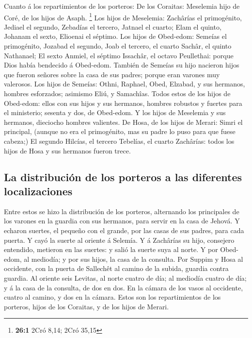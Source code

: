  Cuanto á los repartimientos de los porteros: De los
Coraitas: Meselemia hijo de Coré, de los hijos de Asaph. \footnote{\textbf{26:1}
  2Cró 8,14; 2Cró 35,15}  Los hijos de Meselemia:
Zachârías el primogénito, Jediael el segundo, Zebadías el tercero,
Jatnael el cuarto;  Elam el quinto, Johanam el sexto,
Elioenai el séptimo.  Los hijos de Obed-edom: Semeías el
primogénito, Jozabad el segundo, Joab el tercero, el cuarto Sachâr, el
quinto Nathanael;  El sexto Anmiel, el séptimo Issachâr,
el octavo Peullethai: porque Dios había bendecido á Obed-edom.
 También de Semeías su hijo nacieron hijos que fueron
señores sobre la casa de sus padres; porque eran varones muy valerosos.
 Los hijos de Semeías: Othni, Raphael, Obed, Elzabad, y
sus hermanos, hombres esforzados; asimismo Eliú, y Samachîas.
 Todos estos de los hijos de Obed-edom: ellos con sus
hijos y sus hermanos, hombres robustos y fuertes para el ministerio;
sesenta y dos, de Obed-edom.  Y los hijos de Meselemia y
sus hermanos, dieciocho hombres valientes.  De Hosa, de
los hijos de Merari: Simri el principal, (aunque no era el primogénito,
mas su padre lo puso para que fuese cabeza;)  El segundo
Hilcías, el tercero Tebelías, el cuarto Zachârías: todos los hijos de
Hosa y sus hermanos fueron trece.

\hypertarget{la-distribuciuxf3n-de-los-porteros-a-las-diferentes-localizaciones}{%
\subsection{La distribución de los porteros a las diferentes
localizaciones}\label{la-distribuciuxf3n-de-los-porteros-a-las-diferentes-localizaciones}}

 Entre estos se hizo la distribución de los porteros,
alternando los principales de los varones en la guardia con sus
hermanos, para servir en la casa de Jehová.  Y echaron
suertes, el pequeño con el grande, por las casas de sus padres, para
cada puerta.  Y cayó la suerte al oriente á Selemía. Y á
Zachârías su hijo, consejero entendido, metieron en las suertes: y salió
la suerte suya al norte.  Y por Obed-edom, al mediodía; y
por sus hijos, la casa de la consulta.  Por Suppim y Hosa
al occidente, con la puerta de Sallechêt al camino de la subida, guardia
contra guardia.  Al oriente seis Levitas, al norte cuatro
de día; al mediodía cuatro de día; y á la casa de la consulta, de dos en
dos.  En la cámara de los vasos al occidente, cuatro al
camino, y dos en la cámara.  Estos son los repartimientos
de los porteros, hijos de los Coraitas, y de los hijos de Merari.

